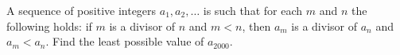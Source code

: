 A sequence of positive integers $a_1,a_2,\ldots $ is such that for each $m$ and $n$ the following holds: if $m$ is a divisor of $n$ and $m<n$,  then $a_m$ is a divisor of $a_n$ and $a_m<a_n$. Find the least possible value of $a_{2000}$.